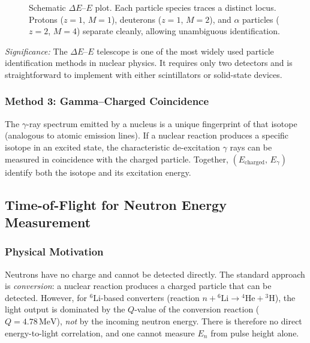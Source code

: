 \begin{figure}[h]
\centering
{}
\caption{Schematic $\Delta E$–$E$ plot.  Each particle species traces a
distinct locus.  Protons ($z{=}1$, $M{=}1$), deuterons ($z{=}1$, $M{=}2$),
and $\alpha$ particles ($z{=}2$, $M{=}4$) separate cleanly, allowing
unambiguous identification.}
\label{fig:lec07:dEE}
\end{figure}

\textit{Significance:} The $\Delta E$–$E$ telescope is one of the most widely
used particle identification methods in nuclear physics.  It requires only two
detectors and is straightforward to implement with either scintillators or
solid-state devices.

\subsubsection*{Method 3: Gamma–Charged Coincidence}

The $\gamma$-ray spectrum emitted by a nucleus is a unique fingerprint of that
isotope (analogous to atomic emission lines).  If a nuclear reaction produces a
specific isotope in an excited state, the characteristic de-excitation $\gamma$
rays can be measured in coincidence with the charged particle.  Together,
$(E_\text{charged},\, E_\gamma)$ identify both the isotope and its excitation energy.

\subsection{Time-of-Flight for Neutron Energy Measurement}
\label{subsec:lec07:tof}

\subsubsection*{Physical Motivation}
Neutrons have no charge and cannot be detected directly.  The standard approach
is \emph{conversion}: a nuclear reaction produces a charged particle that can
be detected.  However, for $^6\text{Li}$-based converters (reaction
$n + {}^6\text{Li} \to {}^4\text{He} + {}^3\text{H}$), the light output is
dominated by the $Q$-value of the conversion reaction ($Q = 4.78\,\text{MeV}$),
\emph{not} by the incoming neutron energy.  There is therefore no direct
energy-to-light correlation, and one cannot measure $E_n$ from pulse height
alone.

